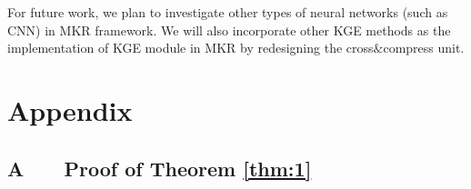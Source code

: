 \documentclass[sigconf]{acmart}
\begin{document}
	For future work, we plan to investigate other types of neural networks (such as CNN) in MKR framework.
	We will also incorporate other KGE methods as the implementation of KGE module in MKR by redesigning the cross$\&$compress unit.
	





\setcounter{theorem}{0}
\setcounter{proposition}{0}
\setcounter{secnumdepth}{4}
\renewcommand\thesubsubsection{\thesubsection.\alph{subsubsection}}


\section*{Appendix}
	\subsection*{A \ \ \ Proof of Theorem \ref{thm:1}}
	
\end{document}
